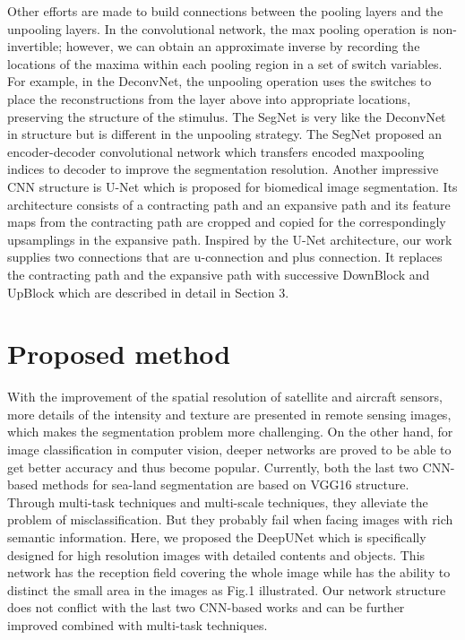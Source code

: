 \documentclass[conference]{IEEEtran}
\begin{document}
Other efforts are made to build connections between the pooling layers and the unpooling layers. In the convolutional network, the max pooling operation is non-invertible; however, we can obtain an approximate inverse by recording the locations of the maxima within each pooling region in a set of switch variables. For example, in the DeconvNet, the unpooling operation uses the switches to place the reconstructions from the layer above into appropriate locations, preserving the structure of the stimulus. The SegNet is very like the DeconvNet in structure but is different in the unpooling strategy. The SegNet\cite{b19} proposed an encoder-decoder convolutional network which  transfers encoded maxpooling indices to decoder to improve the segmentation resolution. Another impressive CNN structure is U-Net\cite{b20} which is proposed for biomedical image segmentation.  Its architecture consists of a contracting path and an expansive path and its feature maps from the contracting path are cropped and copied for the correspondingly upsamplings in the expansive path. Inspired by the U-Net architecture, our work supplies two connections that are u-connection and plus connection.  It replaces the contracting path and the expansive path with successive DownBlock and UpBlock which are described in detail in Section 3.

\section{Proposed method}

With the improvement of the spatial resolution of satellite and aircraft sensors, more details of the intensity and texture are presented in remote sensing images, which makes the segmentation problem more challenging.  On the other hand, for image classification in computer vision, deeper networks are proved to be able to get better accuracy and thus become popular.  Currently, both the last two CNN-based methods for sea-land segmentation are based on VGG16 structure. Through multi-task techniques and multi-scale techniques, they alleviate the problem of misclassification. But they probably fail when facing images with rich semantic information. Here, we proposed the DeepUNet which is specifically designed for high resolution images with detailed contents and objects. This network has the reception field covering the whole image while has the ability to distinct the small area in the images as Fig.1 illustrated. Our network structure does not conflict with the last two CNN-based works and can be further improved combined with multi-task techniques.
\end{document}
